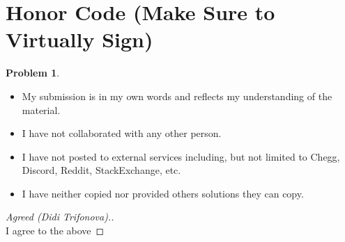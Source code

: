\documentclass[11pt]{article}
\theoremstyle{definition}
\theoremstyle{definition}
\newtheorem{required}{Problem}
\theoremstyle{definition}
\begin{document}
\section{Honor Code (Make Sure to Virtually Sign)} \label{HonorCode}

\begin{required}
\noindent 
\begin{itemize}
\item My submission is in my own words and reflects my understanding of the material.
\item I have not collaborated with any other person.
\item I have not posted to external services including, but not limited to Chegg, Discord, Reddit, StackExchange, etc.
\item I have neither copied nor provided others solutions they can copy.
\end{itemize}

\end{required}

\begin{proof}[Agreed (Didi Trifonova).] \\
I agree to the above
\end{proof}



\newpage
\end{document}
